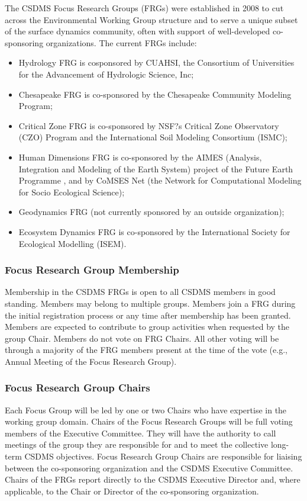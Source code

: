 \documentclass[11pt, oneside]{article}   	%
\begin{document}
The CSDMS Focus Research Groups (FRGs) were established in 2008 to cut across the Environmental Working Group structure and to serve a unique subset of the surface dynamics community, often with support of well-developed co-sponsoring organizations.  The current FRGs include:      
\begin{itemize}
\item	Hydrology FRG is cosponsored by CUAHSI, the Consortium of Universities for the Advancement of Hydrologic Science, Inc;  
\item	Chesapeake FRG is co-sponsored by the Chesapeake Community Modeling Program; 
\item	Critical Zone FRG is co-sponsored by NSF?s Critical Zone Observatory (CZO) Program and the International Soil Modeling Consortium (ISMC); 
\item	Human Dimensions FRG is co-sponsored by the AIMES (Analysis, Integration and Modeling of the Earth System) project of the Future Earth Programme , and by CoMSES Net (the Network for Computational Modeling for Socio Ecological Science);
\item	Geodynamics FRG (not currently sponsored by an outside organization);
\item	Ecosystem Dynamics FRG is co-sponsored by the International Society for Ecological Modelling (ISEM). 
\end{itemize}


\subsubsection{Focus Research Group Membership}

Membership in the CSDMS FRGs is open to all CSDMS members in good standing.  Members may belong to multiple groups.  Members join a FRG during the initial registration process or any time after membership has been granted. Members are expected to contribute to group activities when requested by the group Chair. Members do not vote on FRG Chairs. All other voting will be through a majority of the FRG members present at the time of the vote (e.g., Annual Meeting of the Focus Research Group). 

\subsubsection{	Focus Research Group Chairs}

Each Focus Group will be led by one or two Chairs who have expertise in the working group domain. Chairs of the Focus Research Groups will be full voting members of the Executive Committee. They will have the authority to call meetings of the group they are responsible for and to meet the collective long-term CSDMS objectives. Focus Research Group Chairs are responsible for liaising between the co-sponsoring organization and the CSDMS Executive Committee.  Chairs of the FRGs report directly to the CSDMS Executive Director and, where applicable, to the Chair or Director of the co-sponsoring organization. 
\end{document}

